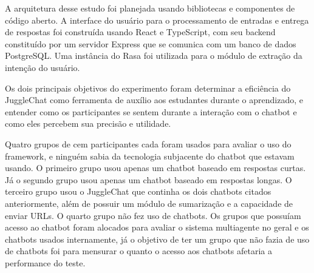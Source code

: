 \begin{figure}[ht] 
   	\captionsetup{width=16cm}
\end{figure}

A arquitetura desse estudo foi planejada usando bibliotecas e componentes de código aberto. A interface do usuário para o processamento de entradas e entrega de respostas foi construída usando React e TypeScript, com seu backend constituído por um servidor Express que se comunica com um banco de dados PostgreSQL. Uma instância do Rasa foi utilizada para o módulo de extração da intenção do usuário.

Os dois principais objetivos do experimento foram determinar a eficiência do JuggleChat como ferramenta de auxílio aos estudantes durante o aprendizado, e entender como os participantes se sentem durante a interação com o chatbot e como eles percebem sua precisão e utilidade.

Quatro grupos de cem participantes cada foram usados para avaliar o uso do framework, e ninguém sabia da tecnologia subjacente do chatbot que estavam usando. O primeiro grupo usou apenas um chatbot baseado em respostas curtas. Já o segundo grupo usou apenas um chatbot baseado em respostas longas. O terceiro grupo usou o JuggleChat que continha os dois chatbots citados anteriormente, além de possuir um módulo de sumarização e a capacidade de enviar URLs. O quarto grupo não fez uso de chatbots. Os grupos que possuíam acesso ao chatbot foram alocados para avaliar o sistema multiagente no geral e os chatbots usados internamente, já o objetivo de ter um grupo que não fazia de uso de chatbots foi para mensurar o quanto o acesso aos chatbots afetaria a performance do teste.

